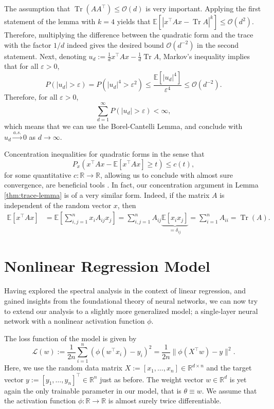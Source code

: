 \documentclass{article}
\begin{document}
The assumption that $\operatorname{Tr}(AA^\top)\leq\mathcal{O}(d)$ is very important. Applying the first statement of the lemma with $k=4$ yields that $\mathbb{E}\left[\left|x^\top A x-\operatorname{Tr}A\right|^k\right]\leq\mathcal{O}(d^2)$. Therefore, multiplying the difference between the quadratic form and the trace with the factor $1/d$ indeed gives the desired bound $\mathcal{O}(d^{-2})$ in the second statement. Next, denoting $u_d:=\frac{1}{d}x^\top A x-\frac{1}{d}\operatorname{Tr}A$, Markov's inequality implies that for all $\varepsilon>0$,
\begin{equation}
P(|u_d|>\varepsilon)=P(|u_d|^4>\varepsilon^2)\leq\frac{\mathbb{E}[|u_d|^4]}{\varepsilon^4}\leq\mathcal{O}(d^{-2}).
\end{equation}
Therefore, for all $\varepsilon>0$,
\begin{equation}
\sum_{d=1}^\infty P(|u_d|>\varepsilon)<\infty,
\end{equation}
which means that we can use the Borel-Cantelli Lemma, and conclude with $u_d\stackrel{a.s.}{\to}0$ as $d\to\infty$.
\bigskip
\par
Concentration inequalities for quadratic forms in the sense that
\begin{equation}
P_x(x^\top A x-\mathbb{E}[x^\top A x]\geq t)\leq c(t),
\end{equation}
for some quantitative $c:\mathbb{R}\to\mathbb{R}$, allowing us to conclude with almost sure convergence, are beneficial tools \cite{couillet, rudelson, louart}. In fact, our concentration argument in Lemma \ref{thm:trace-lemma} is of a very similar form. Indeed, if the matrix $A$ is independent of the random vector $x$, then
\begin{align}
\mathbb{E}[x^\top A x] &= \mathbb{E}\left[\sum_{i,j=1}^n x_iA_{ij}x_j\right]=\sum_{i,j=1}^nA_{ij}\underbrace{\mathbb{E}[x_ix_j]}_{=\delta_{ij}}=\sum_{i=1}^nA_{ii}=\operatorname{Tr}(A).
\end{align}



\newpage
\section{Nonlinear Regression Model} \label{sec:NLRM}
Having explored the spectral analysis in the context of linear regression, and gained insights from the foundational theory of neural networks, we can now try to extend our analysis to a slightly more generalized model; a single-layer neural network with a nonlinear activation function $\phi$.
\bigskip
\par
The loss function of the model is given by
\begin{equation}
\mathcal{L}(w):=\frac{1}{2n}\sum_{i=1}^n(\phi(w^\top x_i)-y_i)^2=\frac{1}{2n}\|\phi(X^\top w)-y\|^2.\label{eq:loss-NLRM}
\end{equation}
Here, we use the random data matrix $X:=[x_1,\dots,x_n]\in\mathbb{R}^{d\times n}$ and the target vector $y:=[y_1,\dots,y_n]^\top\in\mathbb{R}^n$ just as before. The weight vector $w\in\mathbb{R}^d$ is yet again the only trainable parameter in our model, that is $\theta\equiv w$. We assume that the activation function $\phi:\mathbb{R}\to\mathbb{R}$ is almost surely twice differentiable.
\end{document}
